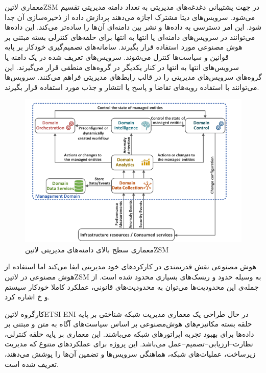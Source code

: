 معماری ‌لاتین{ZSM} در جهت پشتیبانی دغدغه‌های مدیریتی به تعداد دامنه مدیریتی تقسیم می‌شود. سرویس‌های دیتا مشترک اجازه می‌دهند پردازش داده از ذخیره‌سازی آن جدا شود.
این امر دسترسی به داده‌ها و نشر بین دامنه‌ای آن‌ها را ساده‌تر می‌کند. این داده‌ها می‌توانند در سرویس‌های دامنه‌ای یا انتها به انتها برای حلقه‌های کنترلی بسته مبتنی بر هوش مصنوعی مورد استفاده قرار بگیرند.
سامانه‌های تصمیم‌گیری خودکار بر پایه قوانین و سیاست‌ها کنترل می‌شوند.
سرویس‌های تعریف شده در یک دامنه یا سرویس‌های انتها به انتها در کنار یکدیگر در گروه‌های منطقی قرار می‌گیرند. این گروه‌های سرویس‌های مدیریتی را در قالب رابط‌های مدیریتی فراهم می‌کنند.
سرویس‌ها می‌توانند با استفاده رویه‌های تقاضا و پاسخ یا انتشار و جذب مورد استفاده قرار بگیرند.

\begin{figure}
  \centering
  \includegraphics[width=\textwidth]{./fig/zsm-arch.png}
  \caption{معماری سطح بالای دامنه‌های مدیریتی ‌لاتین{ZSM}}
\end{figure}

هوش مصنوعی نقش قدرتمندی در کارکردهای خود مدیریتی ایفا می‌کند اما استفاده از هوش مصنوعی در ‌لاتین{ZSM} به وسیله حدود و ریسک‌های بسیاری محدود شده است.
از جمله‌ی این محدودیت‌ها می‌توان به محدودیت‌های قانونی، عملکرد کاملا خودکار سیستم و ‌خ اشاره کرد.




کارگروه ‌لاتین{ETSI ENI} در حال طراحی یک معماری مدیریت شبکه شناختی
بر پایه حلقه بسته مکانیزم‌های هوش‌مصنوعی بر اساس سیاست‌های آگاه به متن و مبتنی بر داده‌ها
برای بهبود تجربه اپراتورهای شبکه می‌باشند.
این معماری بر پایه حلقه کنترلی، نظارت--ارزیابی--تصمیم--عمل می‌باشد.
این پروژه برای عملکردهای متنوع که مدیریت زیرساخت، عملیات‌های شبکه،
هماهنگی سرویس‌ها و تضمین آن‌ها را پوشش می‌دهند،‌ تعریف شده است.

